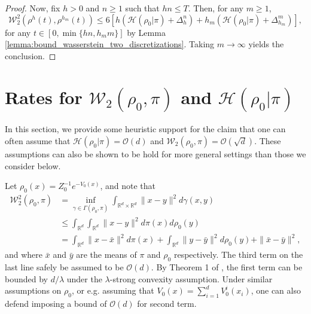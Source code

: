 \documentclass[final,12pt]{colt2018}
\newcommand{\was}{\mathcal{W}}
\begin{document}
\begin{proof}
Now, fix $h>0$ and $n\geq 1$ such that $hn \leq T$. Then, for any $m\geq1$,
\begin{equation}
\was^2_2(\rho^{h}(t), \rho^{h_m}(t))  \leq 6\left[h\left(\mathcal{H}(\rho_{0} | \pi) + \Delta_{h}^{n}\right) + {h_m}\left(\mathcal{H}(\rho_0 | \pi) + \Delta_{h_m}^{m}\right)  \right],
\end{equation}
for any $t\in[0,\min\{hn,h_m m\}]$ by Lemma \ref{lemma:bound_wasserstein_two_discretizations}. Taking $m \to \infty$ yields the conclusion.

\end{proof}

\section{Rates for $\was_2(\rho_0,\pi)$ and $\mathcal{H}(\rho_0 | \pi)$} \label{appendix:rates}
In this section, we provide some heuristic support for the claim that one can often assume that $\mathcal{H}(\rho_0 | \pi) = \mathcal{O}(d)$ and $\was_2(\rho_0,\pi) = \mathcal{O}(\sqrt{d})$. These assumptions can also be shown to be hold for more general settings than those we consider below. 

Let $\rho_0(x) = Z_0^{-1} e^{-V_0(x)}$, and note that
\begin{align*}
\was^2_2(\rho_0,\pi)  & = \inf_{\gamma \in \Gamma(\rho_0,\pi)} \int_{\mathbb{R}^d\times \mathbb{R}^d} \|x-y\|^2 d\gamma(x,y) \\
& \leq \int_{\mathbb{R}^d} \int_{\mathbb{R}^d} \|x-y\|^2 d\pi(x)d\rho_0(y)\\
& = \int_{\mathbb{R}^d} \|x-\bar{x}\|^2 d\pi(x) + \int_{\mathbb{R}^d} \|y-\bar{y}\|^2 d\rho_0(y) + \|\bar{x} - \bar{y}\|^2,
\end{align*}
and where $\bar{x}$ and $\bar{y}$ are the means of $\pi$ and $\rho_0$ respectively. The third term on the last line safely be assumed to be $\mathcal{O}(d)$. By Theorem 1 of \citet{durmus2016high}, the first term can be bounded by $d/\lambda$ under the $\lambda$-strong convexity assumption. Under similar assumptions on $\rho_0$, or e.g. assuming that $V_0(x) = \sum_{i=1}^d V_0^i(x_i)$, one can also defend imposing a bound of $\mathcal{O}(d)$ for second term.
\end{document}
